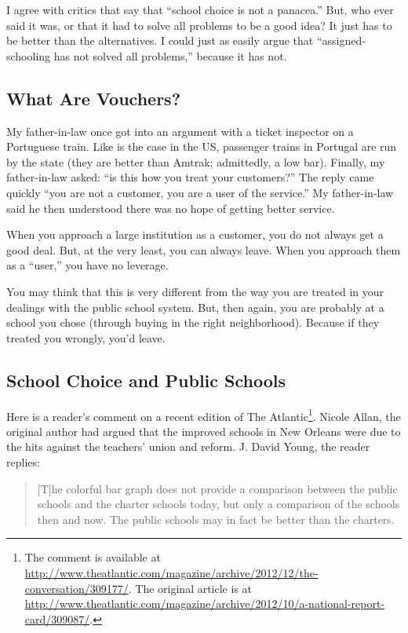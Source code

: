 I agree with critics that say that ``school choice is not a panacea.'' But, who
ever said it was, or that it had to solve all problems to be a good idea? It
just has to be better than the alternatives. I could just as easily argue that
``assigned-schooling has not solved all problems,'' because it has not.

\subsection{What Are Vouchers?}

My father-in-law once got into an argument with a ticket inspector on a
Portuguese train. Like is the case in the US, passenger trains in Portugal are
run by the state (they are better than Amtrak; admittedly, a low bar). Finally,
my father-in-law asked: ``is this how you treat your customers?'' The reply
came quickly ``you are not a customer, you are a user of the service.'' My
father-in-law said he then understood there was no hope of getting better
service.

When you approach a large institution as a customer, you do not always get a
good deal. But, at the very least, you can always leave. When you approach them
as a ``user,'' you have no leverage.

You may think that this is very different from the way you are treated in your
dealings with the public school system. But, then again, you are probably at a
school you chose (through buying in the right neighborhood). Because if they
treated you wrongly, you'd leave.

\subsection{School Choice and Public Schools}

Here is a reader's comment on a recent edition of The Atlantic\footnote{The
comment is available at
\url{http://www.theatlantic.com/magazine/archive/2012/12/the-conversation/309177/}.
The original article is at
\url{http://www.theatlantic.com/magazine/archive/2012/10/a-national-report-card/309087/}.}.
Nicole Allan, the original author had argued that the improved schools in New
Orleans were due to the hits against the teachers' union and reform. J. David
Young, the reader replies:

\begin{quote}
    [T]he colorful bar graph does not provide a comparison between the public
    schools and the charter schools today, but only a comparison of the schools
    then and now. The public schools may in fact be better than the charters.
\end{quote}

